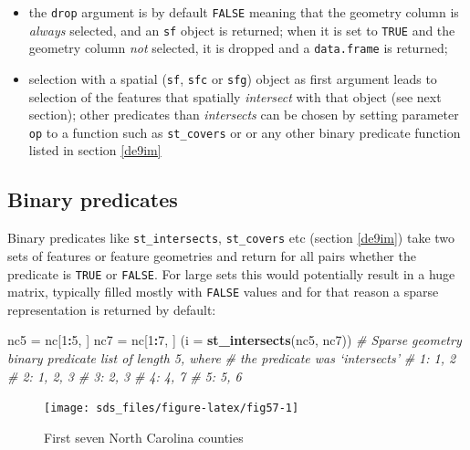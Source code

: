 \documentclass[]{book}
\newenvironment{Shaded}{\begin{snugshade}}{\end{snugshade}}
\newcommand{\CommentTok}[1]{\textcolor[rgb]{0.56,0.35,0.01}{\textit{#1}}}
\newcommand{\DataTypeTok}[1]{\textcolor[rgb]{0.13,0.29,0.53}{#1}}
\newcommand{\DecValTok}[1]{\textcolor[rgb]{0.00,0.00,0.81}{#1}}
\newcommand{\KeywordTok}[1]{\textcolor[rgb]{0.13,0.29,0.53}{\textbf{#1}}}
\newcommand{\NormalTok}[1]{#1}
\newcommand{\OperatorTok}[1]{\textcolor[rgb]{0.81,0.36,0.00}{\textbf{#1}}}
\newcommand{\StringTok}[1]{\textcolor[rgb]{0.31,0.60,0.02}{#1}}
\providecommand{\tightlist}{%
  \setlength{\itemsep}{0pt}\setlength{\parskip}{0pt}}
\begin{document}
\begin{itemize}
\tightlist
\item
  the \texttt{drop} argument is by default \texttt{FALSE} meaning that the
  geometry column is \emph{always} selected, and an \texttt{sf} object is
  returned; when it is set to \texttt{TRUE} and the geometry column \emph{not} selected,
  it is dropped and a \texttt{data.frame} is returned;
\item
  selection with a spatial (\texttt{sf}, \texttt{sfc} or \texttt{sfg}) object as first argument leads to
  selection of the features that spatially \emph{intersect} with that
  object (see next section); other predicates than \emph{intersects} can be chosen by setting
  parameter \texttt{op} to a function such as \texttt{st\_covers} or or any other
  binary predicate function listed in section \ref{de9im}
\end{itemize}

\hypertarget{binary-predicates}{%
\subsection{Binary predicates}\label{binary-predicates}}

Binary predicates like \texttt{st\_intersects}, \texttt{st\_covers} etc (section
\ref{de9im}) take two sets of features or feature geometries and return for
all pairs whether the predicate is \texttt{TRUE} or \texttt{FALSE}. For large
sets this would potentially result in a huge matrix, typically filled
mostly with \texttt{FALSE} values and for that reason a sparse representation
is returned by default:

\begin{Shaded}
\begin{Highlighting}[]
\NormalTok{nc5 =}\StringTok{ }\NormalTok{nc[}\DecValTok{1}\OperatorTok{:}\DecValTok{5}\NormalTok{, ]}
\NormalTok{nc7 =}\StringTok{ }\NormalTok{nc[}\DecValTok{1}\OperatorTok{:}\DecValTok{7}\NormalTok{, ]}
\NormalTok{(}\DataTypeTok{i =} \KeywordTok{st_intersects}\NormalTok{(nc5, nc7))}
\CommentTok{# Sparse geometry binary predicate list of length 5, where}
\CommentTok{# the predicate was `intersects'}
\CommentTok{#  1: 1, 2}
\CommentTok{#  2: 1, 2, 3}
\CommentTok{#  3: 2, 3}
\CommentTok{#  4: 4, 7}
\CommentTok{#  5: 5, 6}
\end{Highlighting}
\end{Shaded}

\begin{figure}

{\centering \texttt{[image: sds\_files/figure-latex/fig57-1]} 

}

\caption{First seven North Carolina counties}\label{fig:fig57}
\end{figure}
\end{document}
